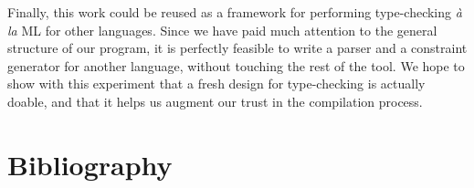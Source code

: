 \documentclass[10pt,a4paper,twoside,titlepage,twocolumn]{article}
\begin{document}
Finally, this work could be reused as a framework for performing type-checking
\emph{à la} ML for other languages. Since we have paid much attention to the
general structure of our program, it is perfectly feasible to write a parser and
a constraint generator for another language, without touching the rest of the
tool. We hope to show with this experiment that a fresh design for type-checking
is actually doable, and that it helps us augment our trust in the compilation
process.

\part{Bibliography}



\end{document}
